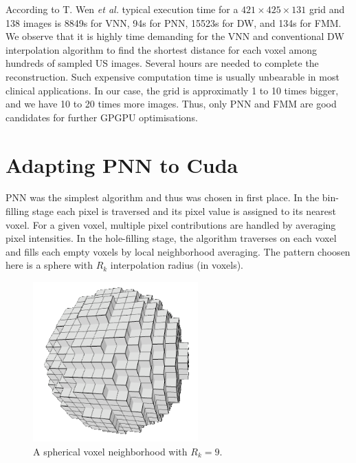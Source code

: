 \documentclass[12pt,journal,compsoc]{IEEEtran}
\begin{document}
According to T. Wen \textit{et al.}\cite{2} typical execution time for a $421\times425\times131$ grid and 138 images is 8849s for VNN, 94s for PNN, 15523s for DW, and 134s for FMM.
We observe that it is highly time demanding for the VNN and conventional DW interpolation algorithm to find the shortest distance for each voxel among hundreds of sampled US images. Several hours are needed to complete the reconstruction. Such expensive computation time is usually unbearable in most clinical applications. In our case, the grid is approximatly 1 to 10 times bigger, and we have 10 to 20 times more images. Thus, only PNN and FMM are good candidates for further GPGPU optimisations.

\section{Adapting PNN to Cuda}

PNN was the simplest algorithm and thus was chosen in first place. 
In the bin-filling stage each pixel is traversed and its pixel value is assigned to its nearest voxel. 
For a given voxel, multiple pixel contributions are handled by averaging pixel intensities.  
In the hole-filling stage, the algorithm traverses on each voxel and fills each empty voxels by local neighborhood averaging. The pattern choosen here is a sphere with $R_k$ interpolation radius (in voxels). 


\begin{figure}[ht!]
\centering
\includegraphics[width=2.5in]{neighborhood}
\caption{A spherical voxel neighborhood with $R_k=9$.}
\label{neighborhood}
\end{figure}
\end{document}
